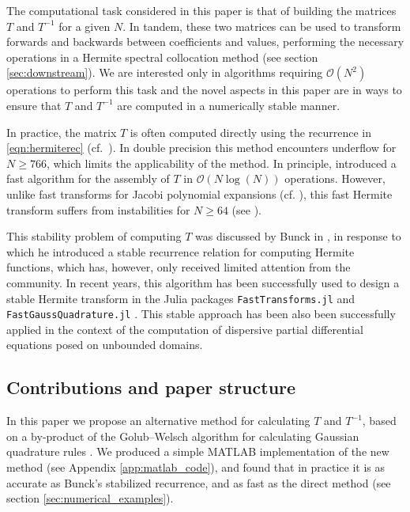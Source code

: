 \documentclass[10pt]{article}
\numberwithin{theorem}{section}
\begin{document}
The computational task considered in this paper is that of building the matrices $T$ and $T^{-1}$ for a given $N$. In tandem, these two matrices can be used to transform forwards and backwards between coefficients and values, performing the necessary operations in a Hermite spectral collocation method (see section \ref{sec:downstream}). We are interested only in algorithms requiring $\mathcal{O}(N^2)$ operations to perform this task and the novel aspects in this paper are in ways to ensure that $T$ and $T^{-1}$ are computed in a numerically stable manner.

In practice, the matrix $T$ is often computed directly using the recurrence in \eqref{eqn:hermiterec} (cf.~\cite{Thalhammer2012,ThCaNe2009,gauckler2011convergence,bao2005fourth, bao2009generalized}). In double precision this method encounters underflow for $N \geq 766$, which limits the applicability of the method. {In principle, \cite{leibon2008fast} introduced a fast algorithm for the assembly of $T$ in $\mathcal{O}(N\log(N))$ operations. However, unlike fast transforms for Jacobi polynomial expansions (cf. \cite{townsend2018fast, slevinsky2018use, olver2020fast}), this fast Hermite transform suffers from instabilities for $N \geq 64$ (see \cite[Table 2]{leibon2008fast}).}

This stability problem of computing $T$ was discussed by Bunck in \cite{bunck2009fast}, in response to which he introduced a stable recurrence relation for computing Hermite functions, which has, however, only received limited attention from the community. In recent years, this algorithm has been successfully used to design a stable Hermite transform in the Julia packages \verb|FastTransforms.jl| and \verb|FastGaussQuadrature.jl| \cite{FastTransforms,FastGaussQuadrature}. This stable approach has been also been successfully applied in the context of the computation of dispersive partial differential equations \cite{banicamaierhoferschratz26,carlesmaierhofer25} posed on unbounded domains.

\subsection{Contributions and paper structure}

In this paper we propose an alternative method for calculating $T$ and $T^{-1}$, based on a by-product of the Golub--Welsch algorithm for calculating Gaussian quadrature rules \cite{golub1969calculation}. We produced a simple MATLAB implementation of the new method (see Appendix \ref{app:matlab_code}), and found that in practice it is as accurate as Bunck's stabilized recurrence, and as fast as the direct method (see section \ref{sec:numerical_examples}).
\end{document}
